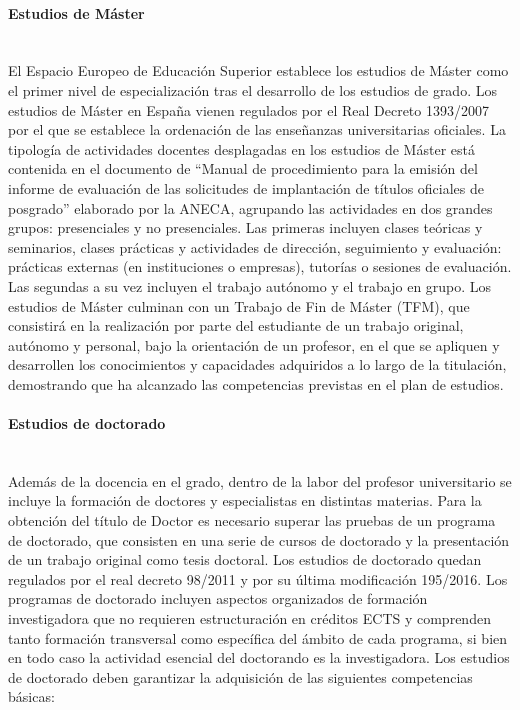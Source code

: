 \paragraph{Estudios de Máster\\\\}

El Espacio Europeo de Educación Superior establece los estudios de Máster como el primer nivel de especialización tras el desarrollo de los estudios de grado. Los estudios de Máster en España vienen regulados por el Real Decreto 1393/2007 por el que se establece la ordenación de las enseñanzas universitarias oficiales. La tipología de actividades docentes desplagadas en los estudios de Máster está contenida en el documento de ``Manual de procedimiento para la emisión del informe de evaluación de las solicitudes de implantación de títulos oficiales de posgrado'' elaborado por la ANECA, agrupando las actividades en dos grandes grupos: presenciales y no presenciales. Las primeras incluyen clases teóricas y seminarios, clases prácticas y actividades de dirección, seguimiento y evaluación: prácticas externas (en instituciones o empresas), tutorías o sesiones de evaluación. Las segundas a su vez incluyen el trabajo autónomo y el trabajo en grupo. Los estudios de Máster culminan con un Trabajo de Fin de Máster (TFM), que consistirá en la realización por parte del estudiante de un trabajo original, autónomo y personal, bajo la orientación de un profesor, en el que se apliquen y desarrollen los conocimientos y capacidades adquiridos a lo largo de la titulación, demostrando que ha alcanzado las competencias previstas en el plan de estudios.

\paragraph{Estudios de doctorado\\\\}

Además de la docencia en el grado, dentro de la labor del profesor universitario se incluye la formación de doctores y especialistas en distintas materias. Para la obtención del título de Doctor es necesario superar las pruebas de un programa de doctorado, que consisten en una serie de cursos de doctorado y la presentación de un trabajo original como tesis doctoral. Los estudios de doctorado quedan regulados por el real decreto 98/2011 y por su última modificación 195/2016. Los programas de doctorado incluyen aspectos organizados de formación investigadora que no requieren estructuración en créditos ECTS y comprenden tanto formación transversal como específica del ámbito de cada programa, si bien en todo caso la actividad esencial del doctorando es la investigadora. Los estudios de doctorado deben garantizar la adquisición de las siguientes competencias básicas:

